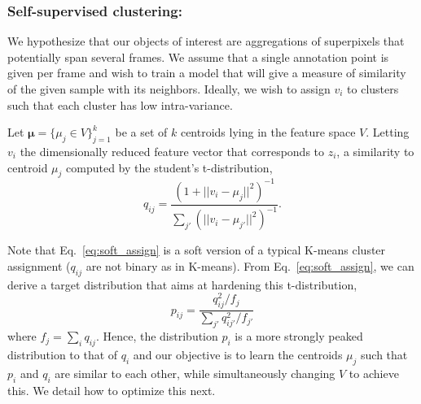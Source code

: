 \subsubsection{Self-supervised clustering: }{ 
We hypothesize that our objects of interest are aggregations of superpixels that potentially span several frames. We assume that a single annotation point is given per frame and wish to train a model that will give a measure of similarity of the given sample with its neighbors. Ideally, we wish to assign  $v_i$ to clusters such that each cluster has low intra-variance. 

Let $\bm{\mu}=\{\mu_j \in V\}_{j=1}^k$ be a set of $k$ centroids lying in the feature space $V$.
Letting $v_i$ the dimensionally reduced feature vector that corresponds to $z_i$, a similarity to centroid $\mu_j$ computed by the student's t-distribution,
\begin{equation}
q_{ij} = \frac{(1 + ||v_i - \mu_j ||^2)^{-1}}{\sum_{j'}(||v_i - \mu_{j'} ||^{2})^{-1}}.
\label{eq:soft_assign}
\end{equation}
}
\noindent
Note that Eq.~\eqref{eq:soft_assign} is a soft version of a typical K-means cluster assignment (\ie $q_{ij}$ are not binary as in K-means). From Eq.~\eqref{eq:soft_assign}, we can derive a target distribution that aims at hardening this t-distribution,
\begin{equation}
p_{ij} = \frac{q_{ij}^2 / f_j}{\sum_{j'}q_{ij'}^2/f_{j'}}
\label{eq:tgt_assign}
\end{equation}
\noindent
where $f_{j}=\sum_i{q_{ij}}$.
Hence, the distribution $p_{i}$ is a more strongly peaked distribution to that of $q_{i}$ and our objective is to learn the centroids $\mu_j$ such that $p_{i}$  and $q_{i}$ are similar to each other, while simultaneously changing $V$ to achieve this.
We detail how to optimize this next.

